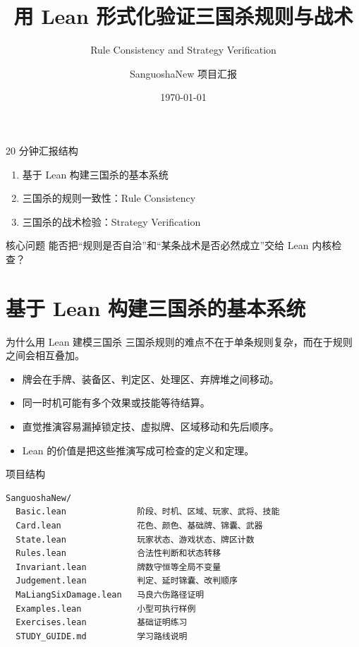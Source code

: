 \documentclass[UTF8,aspectratio=169]{ctexbeamer}
\title{用 Lean 形式化验证三国杀规则与战术}
\subtitle{Rule Consistency and Strategy Verification}
\author{SanguoshaNew 项目汇报}
\date{\today}
\begin{document}
\begin{frame}
  \titlepage
\end{frame}

\begin{frame}{20 分钟汇报结构}
  \begin{enumerate}
    \item 基于 Lean 构建三国杀的基本系统
    \item 三国杀的规则一致性：Rule Consistency
    \item 三国杀的战术检验：Strategy Verification
  \end{enumerate}

  \vspace{1em}
  \begin{block}{核心问题}
    能否把“规则是否自洽”和“某条战术是否必然成立”交给 Lean 内核检查？
  \end{block}
\end{frame}

\section{基于 Lean 构建三国杀的基本系统}

\begin{frame}{为什么用 Lean 建模三国杀}
  三国杀规则的难点不在于单条规则复杂，而在于规则之间会相互叠加。

  \begin{itemize}
    \item 牌会在手牌、装备区、判定区、处理区、弃牌堆之间移动。
    \item 同一时机可能有多个效果或技能等待结算。
    \item 直觉推演容易漏掉锁定技、虚拟牌、区域移动和先后顺序。
    \item Lean 的价值是把这些推演写成可检查的定义和定理。
  \end{itemize}
\end{frame}

\begin{frame}[fragile]{项目结构}
  \begin{verbatim}
SanguoshaNew/
  Basic.lean              阶段、时机、区域、玩家、武将、技能
  Card.lean               花色、颜色、基础牌、锦囊、武器
  State.lean              玩家状态、游戏状态、牌区计数
  Rules.lean              合法性判断和状态转移
  Invariant.lean          牌数守恒等全局不变量
  Judgement.lean          判定、延时锦囊、改判顺序
  MaLiangSixDamage.lean   马良六伤路径证明
  Examples.lean           小型可执行样例
  Exercises.lean          基础证明练习
  STUDY_GUIDE.md          学习路线说明
  \end{verbatim}
\end{frame}
\end{document}
